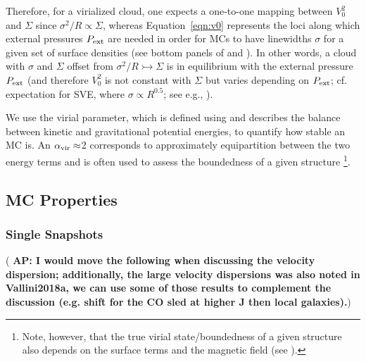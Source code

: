 \documentclass[iop]{emulateapj}
\newcommand{\AP}[1]{({\bf \color{apcolor} AP: #1})}
\begin{document}
Therefore, for a virialized cloud, one expects a one-to-one mapping between $V_0^2$ and $\Sigma$ since
$\sigma^2/R\propto\Sigma$, whereas
Equation~\ref{eqn:v0} represents the loci along which external pressures $P_{\rm ext}$ are
needed in order for MCs to have linewidths $\sigma$ for a given set of surface densities (see bottom panels of  and 
).
In other words, a cloud with $\sigma$ and $\Sigma$ offset from $\sigma^2/R\rightarrowtail\Sigma$
is in equilibrium with the external pressure $P_{\rm ext}$ (and therefore $V_0^2$ is not constant with $\Sigma$ but
varies depending on $P_{\rm ext}$; cf. expectation for SVE, where
$\sigma\propto R^{0.5}$; see e.g., \citealt{Heyer09a, Hughes10a, Hughes13b, Meidt13a}).

We use the virial parameter, which is defined using  and describes 
the balance between kinetic and gravitational potential energies, 
to quantify how stable an MC is. 
An $\alpha_{\rm vir}\approx$2 corresponds to approximately equipartition between the two energy terms 
and is often used to assess the boundedness of a given structure \citep[see e.g., ][]{Kauffmann17b}\footnote{Note, however, that 
the true virial state/boundedness of a given structure also depends on the surface terms and the magnetic field (see ).}.

\subsection{MC Properties}
\subsubsection{Single Snapshots}  \label{sec:singless}

%
\AP{I would move the following when discussing the velocity dispersion; additionally, the large velocity dispersions was also noted in Vallini2018a, we can use some of those results to complement the discussion (e.g. shift for the CO sled at higher J then local galaxies).}
\end{document}
